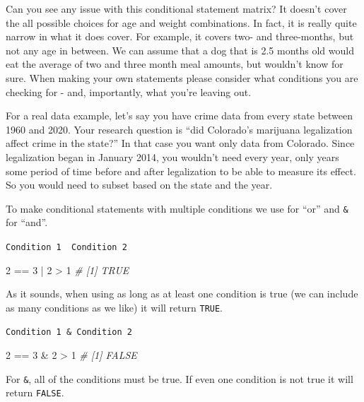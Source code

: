 \documentclass[
]{krantz}
\makeatletter
\newenvironment{Shaded}{\begin{snugshade}}{\end{snugshade}}
\newcommand{\CommentTok}[1]{\textcolor[rgb]{0.37,0.37,0.37}{\textit{#1}}}
\newcommand{\DecValTok}[1]{\textcolor[rgb]{0.06,0.06,0.06}{#1}}
\newcommand{\SpecialCharTok}[1]{\textcolor[rgb]{0,0,0}{#1}}
\newenvironment{kframe}{%
\medskip{}
\setlength{\fboxsep}{.8em}
 \def\at@end@of@kframe{}%
 \ifinner\ifhmode%
  \def\at@end@of@kframe{\end{minipage}}%
  \begin{minipage}{\columnwidth}%
 \fi\fi%
 \def\FrameCommand##1{\hskip\@totalleftmargin \hskip-\fboxsep
 \colorbox{shadecolor}{##1}\hskip-\fboxsep
     \hskip-\linewidth \hskip-\@totalleftmargin \hskip\columnwidth}%
 \MakeFramed {\advance\hsize-\width
   \@totalleftmargin\z@ \linewidth\hsize
   \@setminipage}}%
 {\par\unskip\endMakeFramed%
 \at@end@of@kframe}
\renewenvironment{Shaded}{\begin{kframe}}{\end{kframe}}
\makeatother
\begin{document}
Can you see any issue with this conditional statement
matrix? It doesn't cover the all possible choices for age
and weight combinations. In fact, it is really quite narrow
in what it does cover. For example, it covers two- and
three-months, but not any age in between. We can assume that
a dog that is 2.5 months old would eat the average of two
and three month meal amounts, but wouldn't know for sure.
When making your own statements please consider what
conditions you are checking for - and, importantly, what
you're leaving out.

For a real data example, let's say you have crime data from
every state between 1960 and 2020. Your research question is
``did Colorado's marijuana legalization affect crime in the
state?'' In that case you want only data from Colorado.
Since legalization began in January 2014, you wouldn't need
every year, only years some period of time before and after
legalization to be able to measure its effect. So you would
need to subset based on the state and the year.

To make conditional statements with multiple conditions we
use \texttt{\textbar{}} for ``or'' and \texttt{\&} for
``and''.

\texttt{Condition\ 1\ \textbar{}\ Condition\ 2}

\begin{Shaded}
\begin{Highlighting}[]
\DecValTok{2} \SpecialCharTok{==} \DecValTok{3} \SpecialCharTok{|} \DecValTok{2} \SpecialCharTok{\textgreater{}} \DecValTok{1}
\CommentTok{\# [1] TRUE}
\end{Highlighting}
\end{Shaded}

As it sounds, when using \texttt{\textbar{}} as long as at
least one condition is true (we can include as many
conditions as we like) it will return \texttt{TRUE}.

\texttt{Condition\ 1\ \&\ Condition\ 2}

\begin{Shaded}
\begin{Highlighting}[]
\DecValTok{2} \SpecialCharTok{==} \DecValTok{3} \SpecialCharTok{\&} \DecValTok{2} \SpecialCharTok{\textgreater{}} \DecValTok{1}
\CommentTok{\# [1] FALSE}
\end{Highlighting}
\end{Shaded}

For \texttt{\&}, all of the conditions must be true. If even
one condition is not true it will return \texttt{FALSE}.
\end{document}
